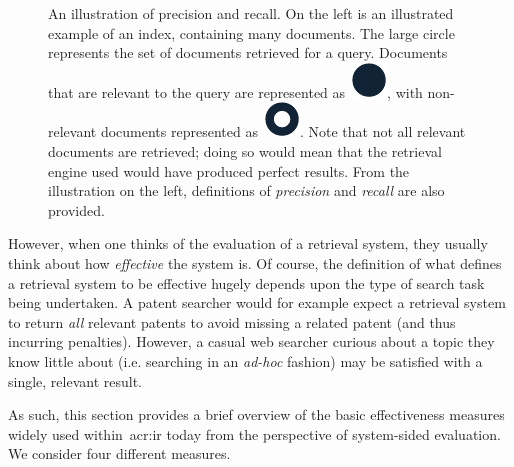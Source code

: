 \begin{figure}[t!]
    \centering
    \caption[Precision and recall]{An illustration of precision and recall. On the left is an illustrated example of an index, containing many documents. The large circle represents the set of documents retrieved for a query. Documents that are relevant to the query are represented as~\includegraphics[height=\fontcharht\font`\d]{figures/ch2-pr-r.pdf}, with non-relevant documents represented as~\includegraphics[height=\fontcharht\font`\d]{figures/ch2-pr-nr.pdf}. Note that not all relevant documents are retrieved; doing so would mean that the retrieval engine used would have produced perfect results. From the illustration on the left, definitions of \emph{precision} and \emph{recall} are also provided.}
    \label{fig:pr}
\end{figure}

However, when one thinks of the evaluation of a retrieval system, they usually think about how \emph{effective} the system is. Of course, the definition of what defines a retrieval system to be effective hugely depends upon the type of search task being undertaken. A patent searcher would for example expect a retrieval system to return \emph{all} relevant patents to avoid missing a related patent (and thus incurring penalties). However, a casual web searcher curious about a topic they know little about (i.e. searching in an \emph{ad-hoc} fashion) may be satisfied with a single, relevant result.

As such, this section provides a brief overview of the basic effectiveness measures widely used within~\gls{acr:ir} today from the perspective of system-sided evaluation. We consider four different measures.

